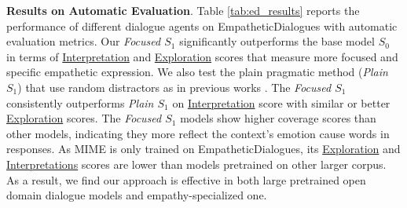 \documentclass[11pt]{article}
\begin{document}
\textbf{Results on Automatic Evaluation}.
Table \ref{tab:ed_results} reports the performance of different dialogue agents on EmpatheticDialogues \citep{Rashkin:2019:ACL} with automatic evaluation metrics.
Our \textit{Focused $S_1$} significantly outperforms the base model $S_0$ in terms of \underline{Interpretation} and \underline{Exploration} scores that measure more focused and specific empathetic expression.
We also test the plain pragmatic method (\textit{Plain $S_1$}) that use random distractors as in previous works \citep{Cohn:2018:NAACL, Kim:2020:EMNLP}.
The \textit{Focused $S_1$} consistently outperforms \textit{Plain $S_1$} on \underline{Interpretation} score with similar or better \underline{Exploration} scores.  The \textit{Focused $S_1$} models show higher coverage scores than other models, indicating they more reflect the context's emotion cause words in responses.
As MIME is only trained on EmpatheticDialogues, its \underline{Exploration} and \underline{Interpretations} scores are lower than models pretrained on other larger corpus.
As a result, we find our approach is effective in both large pretrained open domain dialogue models and empathy-specialized one.
\end{document}
